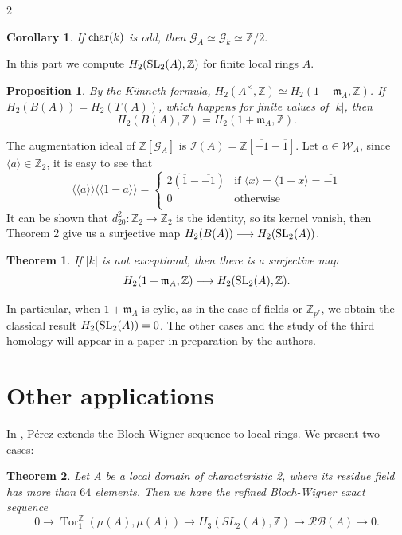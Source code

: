 \documentclass[a0]{sciposter}
\newtheorem{prp}{Proposition}
\newtheorem{thm}{Theorem}
\newtheorem{cor}{Corollary}
\theoremstyle{definition}
\newcommand{\z}{\mathbb{Z}}
\newcommand{\GG}{\mathcal{G}}
\newcommand{\WW}{\mathcal{W}}
\newcommand{\II}{\mathcal{I}}
\newcommand{\mmm}{\mathfrak{m}}
\renewcommand{\aa}{{A^\times}}
\newcommand{\lan}{\langle}
\newcommand{\ran}{\rangle}
\newcommand{\Lan}{\langle \! \langle}
\newcommand{\Ran}{\rangle \! \rangle}
\newcommand{\SL}{{\rm SL}}
\renewcommand{\char}{{\rm char}}
\begin{document}
\begin{multicols}{2}
\begin{cor}
If $\char(k)$ is odd, then $\GG_A\simeq \GG_k\simeq \z/2.$
\end{cor}

In this part we compute $H_2(\SL_2(A),\z)$ for finite local rings $A$. 

\begin{prp} \label{exceptions}
By the Künneth formula,
$ H_2 (\aa,\z) \simeq H_2 (1 +\mmm_A,\z) $.
If $ H_2(B(A)) = H_2(T(A)) $, which happens for finite values of $|k|$, then 
\begin{equation*}\label{eqh2h2}
  H_2(B(A),\z) = H_2(1 +\mmm_A, \z).  
\end{equation*}
\end{prp}

 The augmentation ideal of $\z[\GG_A]$ is $\II (A) = \z[ \overline{-1} - \overline{1} ]$. Let $a \in \WW _A $, since $\lan a \ran \in \z_2$, it is easy to see that 
\begin{equation*} \label{eq:2}
\Lan a \Ran \Lan 1-a \Ran = 
\begin{cases} 
    2 (\overline{1} - \overline{-1}) & \text{if } \lan x \ran = \lan 1-x \ran = \overline{-1} \\
0 & \text{otherwise } \\ 
\end{cases}
\end{equation*}
It can be shown that $d^2_{20}: \z_2 \rightarrow \z_2$ is the identity, so its kernel vanish, then Theorem 2 give us a surjective map $ H_2(B(A)) \longrightarrow H_2 (\SL_2 (A))  $.

\begin{thm}\label{generalimpar} If $|k|$ is not exceptional, then there is a surjective map
    $$H_2(1+\mmm_A ,\z) \longrightarrow H_2(\SL_2(A),\z).$$
\end{thm}
In particular, when $1+ \mmm_A$ is cylic, as in the case of fields or $\z_{p^r} $, we obtain the classical result $H_2(\SL_2(A))=0$. The other cases and the study of the third homology will appear in a paper in preparation by the authors. 

\section{Other applications}

In \cite{tesiselvis}, Pérez extends the Bloch-Wigner sequence to local rings. We present two cases:

\begin{thm} Let A be a local domain of characteristic 2, where its residue field has more than $64$ elements. Then we have the refined Bloch-Wigner exact sequence
$$
0 \rightarrow \operatorname{Tor}_1^{\z}(\mu(A), \mu(A)) \rightarrow H_3\left(S L_2(A), \mathbb{Z}\right) \rightarrow \mathcal{RB}(A) \rightarrow 0 .
$$
\end{thm}


\end{multicols}
\end{document}
